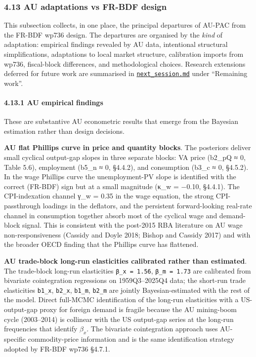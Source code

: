 \documentclass[
]{article}
\begin{document}
\subsubsection{4.13 AU adaptations vs FR-BDF
design}\label{au-adaptations-vs-fr-bdf-design}

This subsection collects, in one place, the principal departures of
AU-PAC from the FR-BDF wp736 design. The departures are organised by the
\emph{kind} of adaptation: empirical findings revealed by AU data,
intentional structural simplifications, adaptations to local market
structure, calibration imports from wp736, fiscal-block differences, and
methodological choices. Research extensions deferred for future work are
summarised in \href{../next_session.md}{\texttt{next\_session.md}} under
``Remaining work''.

\paragraph{4.13.1 AU empirical findings}\label{au-empirical-findings}

These are substantive AU econometric results that emerge from the
Bayesian estimation rather than design decisions.

\textbf{AU flat Phillips curve in price and quantity blocks}. The
posteriors deliver small cyclical output-gap slopes in three separate
blocks: VA price (b2\_pQ ≈ 0, Table 5.6), employment (b5\_n ≈ 0,
§4.4.2), and consumption (b3\_c ≈ 0, §4.5.2). In the wage Phillips curve
the unemployment-PV slope is identified with the correct (FR-BDF) sign
but at a small magnitude (κ\_w = −0.10, §4.4.1). The CPI-indexation
channel γ\_w = 0.35 in the wage equation, the strong CPI-passthrough
loadings in the deflators, and the persistent forward-looking real-rate
channel in consumption together absorb most of the cyclical wage and
demand-block signal. This is consistent with the post-2015 RBA
literature on AU wage non-responsiveness (Cassidy and Doyle 2018; Bishop
and Cassidy 2017) and with the broader OECD finding that the Phillips
curve has flattened.

\textbf{AU trade-block long-run elasticities calibrated rather than
estimated}. The trade-block long-run elasticities
\texttt{β\_x\ =\ 1.56}, \texttt{β\_m\ =\ 1.73} are calibrated from
bivariate cointegration regressions on 1959Q3--2025Q4 data; the
short-run trade elasticities \texttt{b1\_x}, \texttt{b2\_x},
\texttt{b1\_m}, \texttt{b2\_m} are jointly Bayesian-estimated with the
rest of the model. Direct full-MCMC identification of the long-run
elasticities with a US-output-gap proxy for foreign demand is fragile
because the AU mining-boom cycle (2003--2014) is collinear with the US
output-gap series at the long-run frequencies that identify \(\beta_x\).
The bivariate cointegration approach uses AU-specific commodity-price
information and is the same identification strategy adopted by FR-BDF
wp736 §4.7.1.
\end{document}
